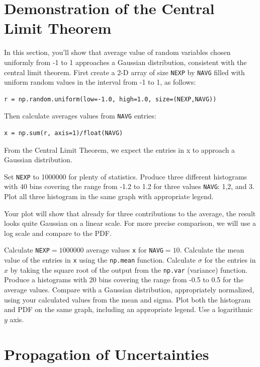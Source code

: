 \section{Demonstration of the Central Limit Theorem}

In this section, you'll show that average value of random variables
chosen uniformly from -1 to 1 approaches a Gaussian distribution,
consistent with the central limit theorem.  First create a 2-D array
of size {\tt NEXP} by {\tt NAVG} filled with uniform random values in
the interval from -1 to 1, as follows:
\begin{verbatim}
r = np.random.uniform(low=-1.0, high=1.0, size=(NEXP,NAVG))
\end{verbatim}
Then calculate averages values from {\tt NAVG} entries:
\begin{verbatim}
x = np.sum(r, axis=1)/float(NAVG)  
\end{verbatim}
From the Central Limit Theorem, we expect the entries in x to approach a Gaussian distribution.

\begin{plot}  Set {\tt NEXP} to 1000000 for plenty of statistics.
Produce three different histograms with 40 bins covering the range
from -1.2 to 1.2 for three values {\tt NAVG}: 1,2, and 3.  Plot all
three histogram in the same graph with appropriate legend. \end{plot}

Your plot will show that already for three contributions to the average, the result looks quite Gaussian on a linear scale.  For more precise comparison, we will use a log scale and compare to the PDF.

\begin{plot} Calculate {\tt NEXP}$=1000000$ average values {\tt x} for {\tt NAVG}$=10$.  Calculate the mean value of the entries in {\tt x} using the {\tt np.mean} function.  Calculate $\sigma$ for the entries in $x$ by taking the square root of the output from the {\tt np.var} (variance) function.  Produce a histograms with 20 bins covering the range
from -0.5 to 0.5 for the average values.  Compare with a Gaussian distribution, appropriately normalized, using your calculated values from the  mean and sigma.  Plot both the histogram and PDF on the same graph, including an appropriate legend.  Use a logarithmic $y$ axis. \end{plot}

\section{Propagation of Uncertainties}

